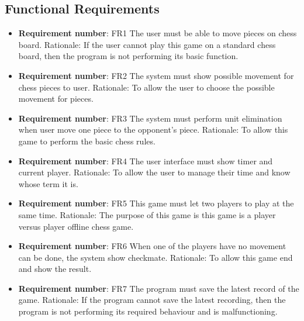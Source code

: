 \documentclass[12pt, titlepage]{article}
\begin{document}
\subsection{Functional Requirements}
\begin{itemize}
\item \textbf{Requirement number}: FR1 \newline
 The user must be able to move pieces on chess board. \newline
Rationale: If the user cannot play this game on a standard chess board, then the program is not performing its basic function.
\item \textbf{Requirement number}: FR2   \newline
The system must show possible movement for chess pieces to user. \newline
Rationale: To allow the user to choose the possible movement for pieces. 
\item \textbf{Requirement number}: FR3  \newline
The system must perform unit elimination when user move one piece to the opponent’s piece.\newline
Rationale: To allow this game to perform the basic chess rules.
\item \textbf{Requirement number}: FR4 \newline
The user interface must show timer and current player. \newline
Rationale: To allow the user to manage their time and know whose term it is. 
\item \textbf{Requirement number}: FR5 \newline
This game must let two players to play at the same time. \newline
Rationale: The purpose of this game is this game is a player versus player offline chess game.
 
\item \textbf{Requirement number}: FR6 \newline
When one of the players have no movement can be done, the system show checkmate.\newline
Rationale: To allow this game end and show the result.
 
\item \textbf{Requirement number}: FR7\newline
The program must save the latest record of the game.\newline
Rationale: If the program cannot save the latest recording, then the program is not performing its required behaviour and is malfunctioning.
 

\end{itemize}
\end{document}
